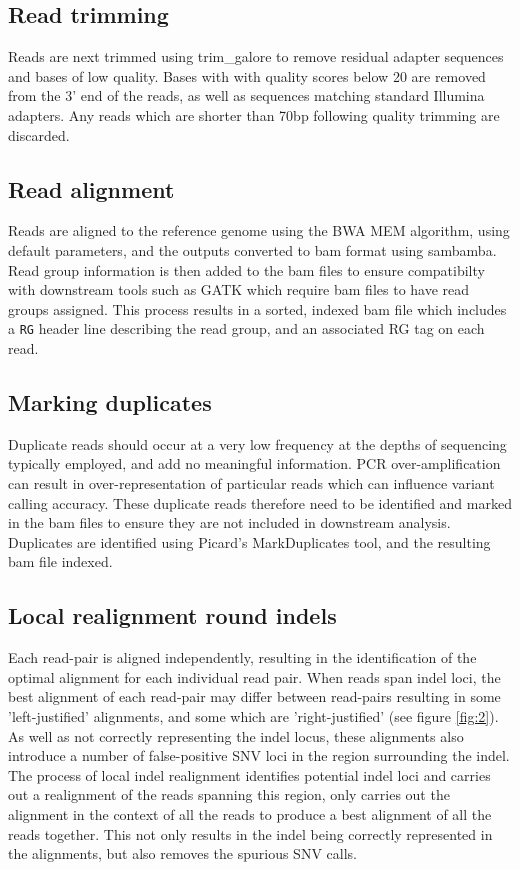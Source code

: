 \documentclass[a4paper,10pt,twoside]{article}
\begin{document}
\subsection{Read trimming}

Reads are next trimmed using trim\_galore to remove residual adapter sequences
and bases of low quality. Bases with with quality scores below 20 are removed
from the 3' end of the reads, as well as sequences matching standard Illumina
adapters. Any reads which are shorter than 70bp following quality trimming are
discarded.

\subsection{Read alignment}

Reads are aligned to the reference genome using the BWA MEM algorithm, using
default parameters, and the outputs converted to bam format using sambamba.
Read group information is then added to the bam files to ensure compatibilty
with downstream tools such as GATK which require bam files to have read groups
assigned. This process results in a sorted, indexed bam file which includes a
{\tt RG} header line describing the read group, and an associated RG tag on
each read.

\subsection{Marking duplicates}

Duplicate reads should occur at a very low frequency at the depths of
sequencing typically employed, and add no meaningful information. PCR
over-amplification can result in over-representation of particular reads which
can influence variant calling accuracy. These duplicate reads therefore need to
be identified and marked in the bam files to ensure they are not included in
downstream analysis.  Duplicates are identified using Picard's MarkDuplicates
tool, and the resulting bam file indexed.

\subsection{Local realignment round indels}

Each read-pair is aligned independently, resulting in the identification of the
optimal alignment for each individual read pair. When reads span indel loci,
the best alignment of each read-pair may differ between read-pairs resulting in
some 'left-justified' alignments, and some which are 'right-justified' (see
figure \ref{fig:2}). As well as not correctly representing the indel locus,
these alignments also introduce a number of false-positive SNV loci in the
region surrounding the indel. The process of local indel realignment identifies
potential indel loci and carries out a realignment of the reads spanning this
region, only carries out the alignment in the context of all the reads to
produce a best alignment of all the reads together. This not only results in
the indel being correctly represented in the alignments, but also removes the
spurious SNV calls.
\end{document}
